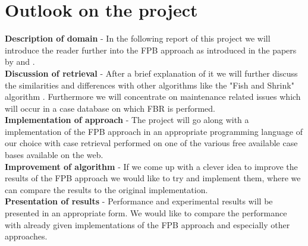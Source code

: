 \documentclass[11pt]{article}
\begin{document}
\section{Outlook on the project}
%
\textbf{Description of domain} - In the following report of this project we will introduce the reader further into the FPB approach as introduced in the papers by \cite{FPBR} and \cite{FPBR2}.\\[1em]
%
\textbf{Discussion of retrieval} - After a brief explanation of it we will further discuss the similarities and differences with other algorithms like the "Fish and Shrink" algorithm \cite{FAS}. Furthermore we will concentrate on maintenance related issues which will occur in a case database on which FBR is performed.\\[1em]
%
\textbf{Implementation of approach} - The project will go along with a implementation of the FPB approach in an appropriate programming language of our choice with case retrieval performed on one of the various free available case bases available on the web.\\[1em]
%
\textbf{Improvement of algorithm} - If we come up with a clever idea to improve the results of the FPB approach we would like to try and implement them, where we can compare the results to the original implementation.\\[1em]
%
\textbf{Presentation of results} - Performance and experimental results will be presented in an appropriate form. We would like to compare the performance with already given implementations of the FPB approach and especially other approaches.\\[1em]
%



%
%



%
%
\end{document}
